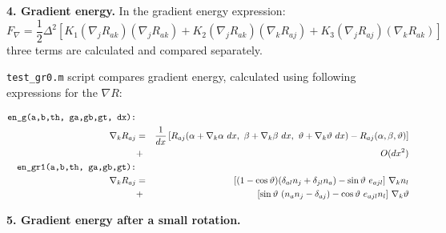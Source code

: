 \documentclass[a4paper]{article}
\def\ct{\cos\vartheta}
\def\st{\sin\vartheta}
\begin{document}
{\bf 4. Gradient energy.} In the gradient energy expression:
$$
F_\nabla \label{eq:He3_en_g}
= \frac12 \Delta^2 \left[
  K_1 (\nabla_j R_{ak})(\nabla_j R_{ak})
+ K_2 (\nabla_j R_{ak})(\nabla_k R_{aj})
+ K_3 (\nabla_j R_{aj})(\nabla_k R_{ak}) \right]
$$
three terms are calculated and compared separately.

{\tt test\_gr0.m} script compares gradient energy, calculated using following
expressions for the $\nabla R$:

\begin{eqnarray*}
\mbox{\tt en\_g(a,b,th, ga,gb,gt, dx):} &&\\
\nabla_k R_{aj} &=&
\frac{1}{dx}\left[
R_{aj}(\alpha+\nabla_k\alpha\ dx,\ \beta+\nabla_k\beta\ dx,\ \vartheta+\nabla_k\vartheta\ dx) -
R_{aj}(\alpha, \beta, \vartheta)\right]\\
&+& O(dx^2)
\\
\mbox{\tt en\_gr1(a,b,th, ga,gb,gt):} &&\\
\nabla_k R_{aj} &=&
 [(1-\ct)(\delta_{al} n_j + \delta_{jl} n_a) - \st\ e_{ajl}]\ \nabla_k n_l\\
&+& [\st\ (n_a n_j - \delta_{aj}) - \ct\ e_{ajl} n_l]\ \nabla_k \vartheta
\end{eqnarray*}

{\bf 5. Gradient energy after a small rotation.} 
\end{document}
